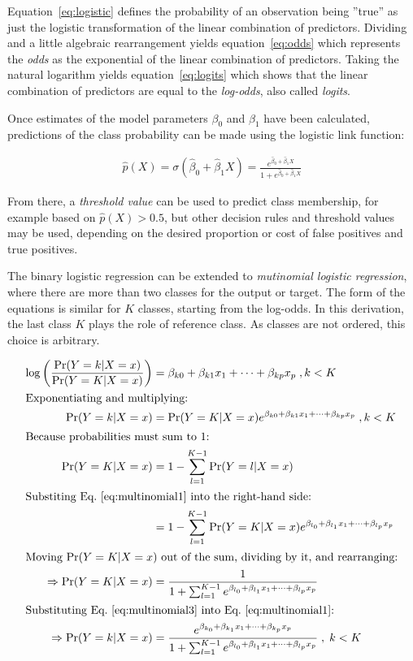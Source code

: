 Equation~\ref{eq:logistic} defines the probability of an observation being ''true'' as just the logistic transformation of the linear combination of predictors. Dividing and a little algebraic rearrangement yields equation~\ref{eq:odds} which represents the \emph{odds} as the exponential of the linear combination of predictors. Taking the natural logarithm yields equation~\ref{eq:logits} which shows that the linear combination of predictors are equal to the \emph{log-odds}, also called \emph{logits}.

Once estimates of the model parameters $\beta_0$ and $\beta_1$ have been calculated, predictions of the class probability can be made using the logistic link function:

\begin{align*}
  \hat{p}(X) = \sigma(\hat{\beta}_0 + \hat{\beta}_1 X) = \frac{e^{\hat{\beta}_0 + \hat{\beta}_1 X}}{1 + e^{\hat{\beta}_0 + \hat{\beta}_1 X}}
\end{align*}

From there, a \emph{threshold value} can be used to predict class membership, for example based on $\hat{p}(X) > 0.5$, but other decision rules and threshold values may be used, depending on the desired proportion or cost of false positives and true positives.

The binary logistic regression can be extended to \emph{mutinomial logistic regression}, where there are more than two classes for the output or target. The form of the equations is similar for $K$ classes, starting from the log-odds. In this derivation, the last class $K$ plays the role of reference class. As classes are not ordered, this choice is arbitrary.

\begin{align}
\log \left( \frac{\Pr(Y=k | X=x)}{\Pr(Y=K | X=x)}\right) &= \beta_{k0}+\beta_{k1}x_1 + \cdots + \beta_{kp}x_p \; , k<K \nonumber \\
\intertext{Exponentiating and multiplying:}
\Pr(Y=k | X=x) &= \Pr(Y=K | X=x) e^{\beta_{k0}+\beta_{k1}x_1 + \cdots + \beta_{kp}x_p} \;, k<K \label{eq:multinomial1} \\
\intertext{Because probabilities must sum to 1:}
\Pr(Y=K | X=x) &= 1 - \sum_{l=1}^{K-1} \Pr(Y=l | X=x) \nonumber \\
\intertext{Substiting Eq.~\ref{eq:multinomial1} into the right-hand side:}
&= 1 - \sum_{l=1}^{K-1} \Pr(Y=K | X=x) e^{\beta_{l_0}+\beta_{l_1}x_1 + \cdots + \beta_{l_p}x_p} \nonumber \\
\intertext{Moving $\Pr(Y=K|X=x)$ out of the sum, dividing by it, and rearranging:}
\Rightarrow \Pr(Y=K | X = x) &= \frac{1}{1 + \sum_{l=1}^{K-1} e^{\beta_{l_0}+\beta_{l_1}x_1 + \cdots + \beta_{l_p}x_p}} \label{eq:multinomial3} \\
\intertext{Substituting Eq.~\ref{eq:multinomial3} into Eq.~\ref{eq:multinomial1}:}
\Rightarrow \Pr(Y=k|X=x) &= \frac{e^{\beta_{k_0}+\beta_{k_1}x_1 + \cdots + \beta_{k_p}x_p}}{1 + \sum_{l=1}^{K-1} e^{\beta_{l_0}+\beta_{l_1}x_1 + \cdots + \beta_{l_p}x_p}} \;, \; k < K \label{eq:multinomial4} 
\end{align}

